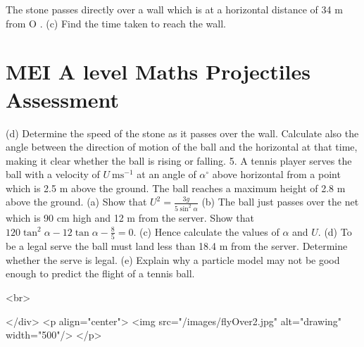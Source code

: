 The stone passes directly over a wall which is at a horizontal distance of 34 m from O .
(c) Find the time taken to reach the wall.

\section*{MEI A level Maths Projectiles Assessment}
(d) Determine the speed of the stone as it passes over the wall. Calculate also the angle between the direction of motion of the ball and the horizontal at that time, making it clear whether the ball is rising or falling.
5. A tennis player serves the ball with a velocity of $U \mathrm{~ms}^{-1}$ at an angle of $\alpha^{\circ}$ above horizontal from a point which is 2.5 m above the ground. The ball reaches a maximum height of 2.8 m above the ground.
(a) Show that $U^{2}=\frac{3 g}{5 \sin ^{2} \alpha}$
(b) The ball just passes over the net which is 90 cm high and 12 m from the server. Show that $120 \tan ^{2} \alpha-12 \tan \alpha-\frac{8}{5}=0$.
(c) Hence calculate the values of $\alpha$ and $U$.
(d) To be a legal serve the ball must land less than 18.4 m from the server. Determine whether the serve is legal.
(e) Explain why a particle model may not be good enough to predict the flight of a tennis ball.

<br>

</div>
<p align="center">
<img src="/images/flyOver2.jpg" alt="drawing" width="500"/>
</p>